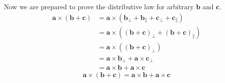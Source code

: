 {\begin{Solution}
Now we are prepared to prove the distributive law for arbitrary $\mathbf{b}$
and $\mathbf{c}$.
\begin{align*}
\mathbf{a} \times ( \mathbf{b} + \mathbf{c} )
        &= \mathbf{a} \times ( \mathbf{b}_\perp + \mathbf{b}_\parallel 
                + \mathbf{c}_\perp + \mathbf{c}_\parallel ) \\
        &= \mathbf{a} \times ( ( \mathbf{b} + \mathbf{c} )_\perp 
                + ( \mathbf{b} + \mathbf{c} )_\parallel ) \\
        &= \mathbf{a} \times ( ( \mathbf{b} + \mathbf{c} )_\perp ) \\
        &= \mathbf{a} \times \mathbf{b}_\perp + \mathbf{a} \times \mathbf{c}_\perp \\
        &= \mathbf{a} \times \mathbf{b}+ \mathbf{a} \times \mathbf{c}
\end{align*}
\[
\boxed{
\mathbf{a} \times ( \mathbf{b} + \mathbf{c} )
        = \mathbf{a} \times \mathbf{b}+ \mathbf{a} \times \mathbf{c}
}
\]
\end{Solution}




}
